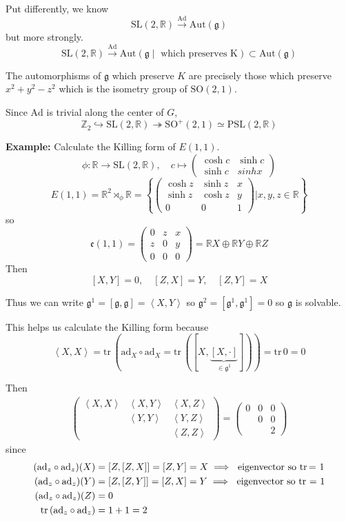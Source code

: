 \documentclass[12pt]{article}
\newcommand{\R}{\mathbb{R}}
\newcommand{\Z}{\mathbb{Z}}
\newcommand{\brak}[1]{\left\langle #1 \right\rangle}
\newcommand{\SL}{\text{SL}}
\newcommand{\SO}{\text{SO}}
\newcommand{\tr}{\text{tr}\,}
\newcommand{\g}{\mathfrak{g}}
\newcommand{\Ad}{\text{Ad}}
\newcommand{\ad}{\text{ad}}
\newcommand{\Aut}{\text{Aut}}
\begin{document}
    Put differently, we know 
    \[\SL(2, \R) \overset{\Ad}{\longrightarrow} \Aut(\g)\]
    but more strongly. 
    \[\SL(2, \R) \overset{\Ad}{\longrightarrow} \Aut(\g \; | \; \text{ which preserves K}) \subset \Aut(\g)\] 

    The automorphisms of $\g$ which preserve $K$ are precisely those which preserve $x^2 + y^2 - z^2$ which is the isometry group of $\SO(2, 1)$.


    Since $\Ad$ is trivial along the center of $G$,
    \[\Z_2 \hookrightarrow \SL(2, \R) \twoheadrightarrow \SO^+(2, 1) \simeq \text{PSL}(2,\R)\]

    \textbf{Example:} Calculate the Killing form of $E(1, 1)$. 
    \[\phi: \R \to \SL(2, \R), \quad c \mapsto \begin{pmatrix}
        \cosh c  & \sinh c\\
        \sinh c & sinh x
    \end{pmatrix}\]
    \[E(1, 1) = \R^2 \rtimes_{\phi} \R = \left\{\begin{pmatrix}
        \cosh z & \sinh z & x\\ 
        \sinh z & \cosh z & y\\
        0 & 0 & 1
    \end{pmatrix} \bigg\vert x, y, z \in \R\right\}\]
    so 
    \[\mathfrak{e}(1, 1) = \begin{pmatrix}
        0 & z & x\\ 
        z & 0 & y\\
        0 & 0 & 0
    \end{pmatrix} = \R X \oplus \R Y \oplus \R Z\]
    Then 
    \[[X, Y] = 0, \quad [Z, X] = Y, \quad [Z, Y] = X\]

    Thus we can write $\g^1 = [\g, \g] = \brak{X, Y}$ so $\g^2 = [\g^1, \g^1] = 0$ so $\g$ is solvable. 

    This helps us calculate the Killing form because 
    \[\brak{X, X} = \tr(\ad_X \circ \ad_X = \tr([X, \underbrace{[X, \cdot]}_{\in \g^1}])) = \tr 0 = 0\]
    
    Then 
    \begin{align*}
        \begin{pmatrix}
            \brak{X, X} & \brak{X, Y} & \brak{X, Z}\\
            & \brak{Y, Y} & \brak{Y, Z}\\
            & & \brak{Z, Z}
        \end{pmatrix} = \begin{pmatrix}
            0 & 0 & 0\\ 
            & 0 & 0\\ 
            & & 2
        \end{pmatrix}
    \end{align*}
    since 
    \begin{align*}
        (\ad_z \circ \ad_z)(X) &= [Z, [Z, X]] = [Z, Y] = X \implies \text{ eigenvector so \tr = 1}\\ 
        (\ad_z \circ \ad_z)(Y) &= [Z, [Z, Y]] = [Z, X] = Y \implies \text{ eigenvector so tr = 1}\\ 
        (\ad_z \circ \ad_z)(Z) &= 0\\ 
        \tr(\ad_z \circ \ad_z) &= 1 + 1 = 2
    \end{align*}
\end{document}
